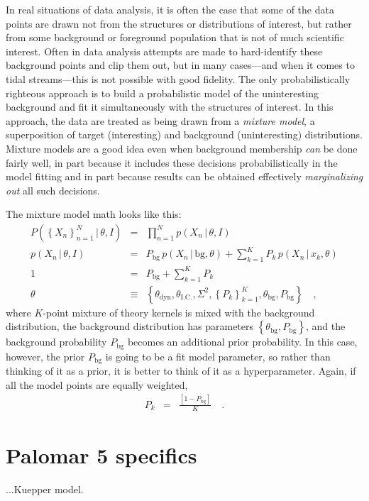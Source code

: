\documentclass[12pt,pdftex,preprint]{aastex}
\newcommand{\setof}[1]{\left\{{#1}\right\}}
\newcommand{\given}{\,|\,}
\newcommand{\bg}{\mathrm{bg}}
\newcommand{\dyn}{\mathrm{dyn}}
\newcommand{\ic}{\mathrm{I.C.}}
\begin{document}
In real situations of data analysis, it is often the case that some of
the data points are drawn not from the structures or distributions of
interest, but rather from some background or foreground population
that is not of much scientific interest.  Often in data analysis
attempts are made to hard-identify these background points and clip
them out, but in many cases---and when it comes to tidal
streams---this is not possible with good fidelity.  The only
probabilistically righteous approach is to build a probabilistic model
of the uninteresting background and fit it simultaneously with the
structures of interest.  In this approach, the data are treated as
being drawn from a \emph{mixture model}, a superposition of target
(interesting) and background (uninteresting) distributions.  Mixture
models are a good idea even when background membership \emph{can} be
done fairly well, in part because it includes these decisions
probabilistically in the model fitting and in part because results can
be obtained effectively \emph{marginalizing out} all such decisions.

The mixture model math looks like this:
\begin{eqnarray}
P(\setof{X_n}_{n=1}^N\given\theta,I) &=& \prod_{n=1}^N p(X_n\given\theta,I)
\\
p(X_n\given\theta,I) &=& P_\bg\,p(X_n\given \bg,\theta) + \sum_{k=1}^K P_k\,p(X_n\given x_k,\theta)
\\
1 &=& P_\bg + \sum_{k=1}^K P_k
\\
\theta &\equiv& \setof{\theta_\dyn, \theta_\ic, \Sigma^2, \setof{P_k}_{k=1}^K, \theta_\bg, P_\bg}
\quad ,
\end{eqnarray}
where $K$-point mixture of theory kernels is mixed with the background
distribution, the background distribution has parameters
$\setof{\theta_\bg, P_\bg}$, and the background probability $P_\bg$
becomes an additional prior probability.  In this case, however, the
prior $P_\bg$ is going to be a fit model parameter, so rather than
thinking of it as a prior, it is better to think of it as a
hyperparameter.  Again, if all the model points are equally weighted,
\begin{eqnarray}
P_k &=& \frac{[1 - P_\bg]}{K}
\quad .
\end{eqnarray}

\section{Palomar 5 specifics}

...Kuepper model.
\end{document}

